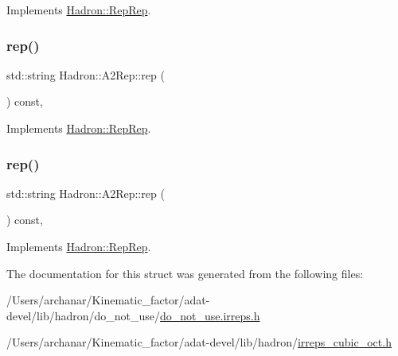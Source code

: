 Implements \mbox{\hyperlink{structHadron_1_1RepRep_ab3213025f6de249f7095892109575fde}{Hadron\+::\+Rep\+Rep}}.

\mbox{\label{structHadron_1_1A2Rep_a31e1135ddb204394f1c6153797a7dffa}} 
\subsubsection{\texorpdfstring{rep()}{rep()}\hspace{0.1cm}{\footnotesize\ttfamily [4/5]}}
{\footnotesize\ttfamily std\+::string Hadron\+::\+A2\+Rep\+::rep (\begin{DoxyParamCaption}{ }\end{DoxyParamCaption}) const\hspace{0.3cm}{\ttfamily [inline]}, {\ttfamily [virtual]}}



Implements \mbox{\hyperlink{structHadron_1_1RepRep_ab3213025f6de249f7095892109575fde}{Hadron\+::\+Rep\+Rep}}.

\mbox{\label{structHadron_1_1A2Rep_a31e1135ddb204394f1c6153797a7dffa}} 
\subsubsection{\texorpdfstring{rep()}{rep()}\hspace{0.1cm}{\footnotesize\ttfamily [5/5]}}
{\footnotesize\ttfamily std\+::string Hadron\+::\+A2\+Rep\+::rep (\begin{DoxyParamCaption}{ }\end{DoxyParamCaption}) const\hspace{0.3cm}{\ttfamily [inline]}, {\ttfamily [virtual]}}



Implements \mbox{\hyperlink{structHadron_1_1RepRep_ab3213025f6de249f7095892109575fde}{Hadron\+::\+Rep\+Rep}}.



The documentation for this struct was generated from the following files\+:\begin{DoxyCompactItemize}
\item 
/\+Users/archanar/\+Kinematic\+\_\+factor/adat-\/devel/lib/hadron/do\+\_\+not\+\_\+use/\mbox{\hyperlink{adat-devel_2lib_2hadron_2do__not__use_2do__not__use_8irreps_8h}{do\+\_\+not\+\_\+use.\+irreps.\+h}}\item 
/\+Users/archanar/\+Kinematic\+\_\+factor/adat-\/devel/lib/hadron/\mbox{\hyperlink{adat-devel_2lib_2hadron_2irreps__cubic__oct_8h}{irreps\+\_\+cubic\+\_\+oct.\+h}}\end{DoxyCompactItemize}
